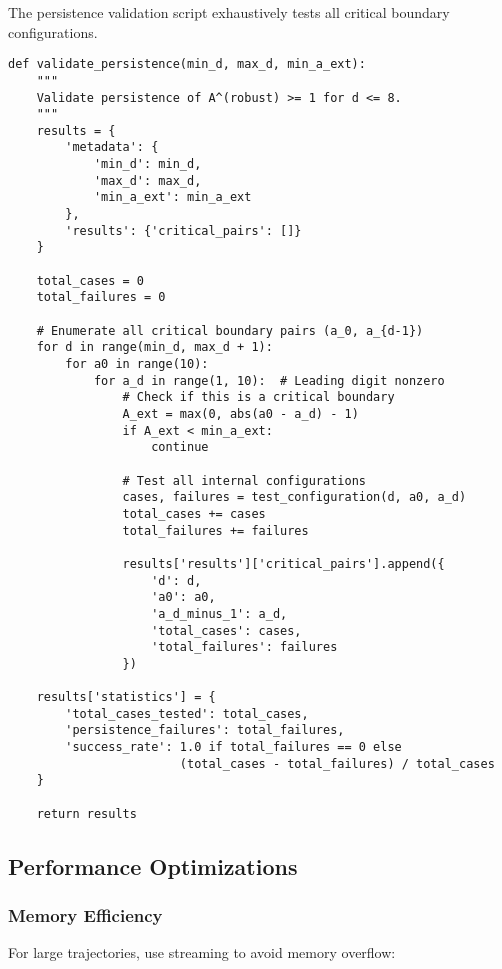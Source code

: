 \documentclass[11pt,a4paper]{article}
\newcommand{\file}[1]{\path{\detokenize{#1}}}
\begin{document}
The persistence validation script \file{validate\_aext5.py} exhaustively tests all critical boundary configurations.

\begin{lstlisting}[style=pythonstyle, caption={Persistence Validation Core}]
def validate_persistence(min_d, max_d, min_a_ext):
    """
    Validate persistence of A^(robust) >= 1 for d <= 8.
    """
    results = {
        'metadata': {
            'min_d': min_d,
            'max_d': max_d,
            'min_a_ext': min_a_ext
        },
        'results': {'critical_pairs': []}
    }
    
    total_cases = 0
    total_failures = 0
    
    # Enumerate all critical boundary pairs (a_0, a_{d-1})
    for d in range(min_d, max_d + 1):
        for a0 in range(10):
            for a_d in range(1, 10):  # Leading digit nonzero
                # Check if this is a critical boundary
                A_ext = max(0, abs(a0 - a_d) - 1)
                if A_ext < min_a_ext:
                    continue
                
                # Test all internal configurations
                cases, failures = test_configuration(d, a0, a_d)
                total_cases += cases
                total_failures += failures
                
                results['results']['critical_pairs'].append({
                    'd': d,
                    'a0': a0,
                    'a_d_minus_1': a_d,
                    'total_cases': cases,
                    'total_failures': failures
                })
    
    results['statistics'] = {
        'total_cases_tested': total_cases,
        'persistence_failures': total_failures,
        'success_rate': 1.0 if total_failures == 0 else 
                        (total_cases - total_failures) / total_cases
    }
    
    return results
\end{lstlisting}

\subsection{Performance Optimizations}

\subsubsection{Memory Efficiency}

For large trajectories, use streaming to avoid memory overflow:
\end{document}
